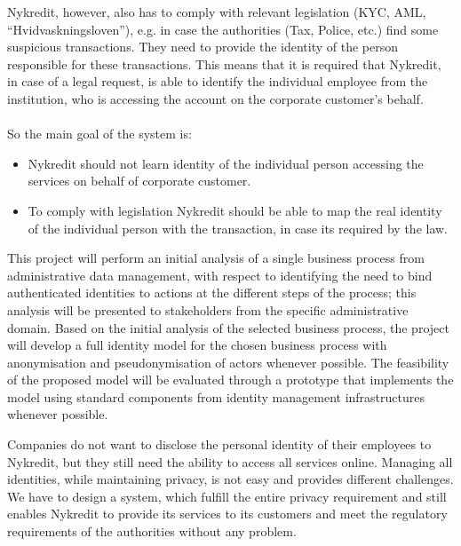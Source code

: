 Nykredit, however, also has to comply with relevant legislation (KYC, AML, “Hvidvaskningsloven”),  e.g. in case the authorities (Tax, Police, etc.) find some suspicious transactions. They need to provide the identity of the person responsible for these transactions.
This means that it is required that Nykredit, in case of a legal request, is able to identify the individual employee from the institution, who is accessing the account on the corporate customer’s behalf.
\\
\\So the main goal of the system is:
\begin{itemize}
	\item Nykredit should not learn identity of the individual person accessing the services on behalf of corporate customer.
	\item To comply with legislation Nykredit should be able to map the real identity of the individual person with the transaction, in case its required by the law.
\end{itemize}
This project will perform an initial analysis of a single business process from administrative data management, with respect to identifying the need to bind authenticated identities to actions at the different steps of the process; this analysis will be presented to stakeholders from the specific administrative domain. Based on the initial analysis of the selected business process, the project will develop a full identity model for the chosen business process with anonymisation and pseudonymisation of actors whenever possible. The feasibility of the proposed model will be evaluated through a prototype that implements the model using standard components from identity management infrastructures whenever possible.

Companies do not want to disclose the personal identity of their employees to Nykredit, but they still need the ability to access all services online. Managing all identities, while maintaining privacy, is not easy and provides different challenges. We have to design a system, which fulfill the entire privacy requirement and still enables Nykredit to provide its services to its customers and meet the regulatory requirements of the authorities without any problem.
 